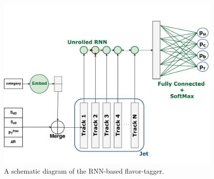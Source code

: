 
\begin{figure}[htbp]
  \centering
  \includegraphics[width=\textwidth]{figures/RNN/RNNIP.pdf}
\caption{A schematic diagram of the RNN-based flavor-tagger.}
  \label{fig:rnn}
\end{figure}



